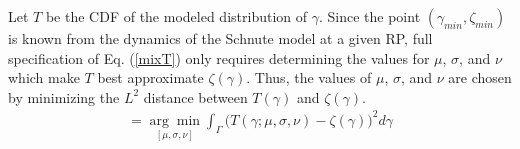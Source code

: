 Let $T$ be the CDF of the modeled distribution of $\gamma$. Since the point
$(\gamma_{min}, \zeta_{min})$ is known from the dynamics of the Schnute model
at a given RP, full specification of Eq. (\ref{mixT}) only requires determining
the values for $\mu$, $\sigma$, and $\nu$ which make $T$ best approximate
$\zeta(\gamma)$. Thus, the values of $\mu$, $\sigma$, and $\nu$ are chosen by
minimizing the $L^2$ distance between $T(\gamma)$ and $\zeta(\gamma)$.
\begin{align}
[\hat\mu, \hat\sigma, \hat\nu]=\underset{{[\mu, \sigma, \nu]}}{\arg\min}\int_\Gamma \big(T(\gamma; \mu, \sigma, \nu) - \zeta(\gamma)\big)^2 d\gamma
\end{align}

